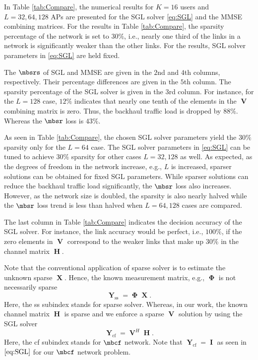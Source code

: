 \documentclass[journal]{IEEEtran}
\begin{document}
In Table \ref{tab:Compare}, the numerical results for $K=16$ users and $L=32,64,128$ APs are presented for the SGL solver \eqref{eq:SGL}
and the MMSE combining matrices. For the results in Table \ref{tab:Compare}, the sparsity percentage of the network is  set to $30\%$, i.e., nearly one third of the links in a network is significantly weaker than the other links. For the results, SGL solver parameters in \eqref{eq:SGL} are held fixed.

The $\mbsrs$ of SGL and MMSE are given in the $2$nd and $4$th columns, respectively. Their percentage differences are given in the $5$th column. The sparsity percentage of the SGL solver is given in the $3$rd column. For instance, for the $L=128$ case, $12\%$ indicates that nearly one tenth of the elements in the $\mbfV$ combining matrix is zero. Thus, the backhaul traffic load is dropped by $88\%$. Whereas the $\mbsr$ loss is $43\%$. 

As seen in Table \ref{tab:Compare}, the chosen SGL solver parameters yield the $30\%$ sparsity only for the $L=64$ case. The SGL solver parameters in \eqref{eq:SGL} can be tuned to achieve $30\%$ sparsity for other cases $L=32,128$ as well. As expected, as the degrees of freedom in the network increase, e.g., $L$ is increased, sparser solutions can be obtained for fixed SGL parameters. While sparser solutions can reduce the backhaul traffic load significantly, the $\mbsr$ loss also increases. However, as the network size is doubled, the sparsity is also nearly halved while the $\mbsr$ loss trend is less than halved when $L=64,128$ cases are compared.

The last column in Table \ref{tab:Compare} indicates the decision accuracy of the SGL solver. For instance, the link accuracy would be perfect, i.e., $100\%$, if the zero elements in $\mbfV$ correspond to the weaker links that make up $30\%$ in the channel matrix $\mbfH$. 

Note that the conventional application of sparse solver is to estimate the unknown sparse $\mbfX$. Hence, the known measurement matrix, e.g., $\mbfPhi$ is not necessarily sparse
\begin{equation}
\mbfY_\text{ss} = \mbfPhi \mbfX.
\end{equation}
Here, the ss subindex stands for sparse solver. Whereas, in our work, the known channel matrix $\mbfH$ is sparse and we enforce a sparse $\mbfV$ solution by using the SGL solver  
\begin{equation}
\mbfY_\text{cf} = \mbfV^H \mbfH .
\end{equation}
Here, the cf subindex stands for $\mbcf$ network. Note that $\mbfY_\text{cf}=\mbfI$ as seen in $\eqref{eq:SGL}$ for our $\mbcf$ network problem.
\end{document}

